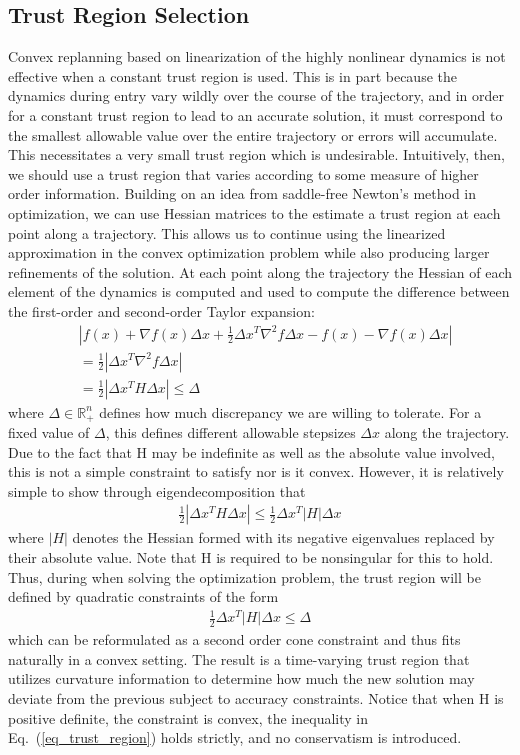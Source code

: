 \documentclass[10pt,a4paper]{article}
\begin{document}
	\subsection{Trust Region Selection}
	Convex replanning based on linearization of the highly nonlinear dynamics is not effective when a constant trust region is used. This is in part because the dynamics during entry vary wildly over the course of the trajectory, and in order for a constant trust region to lead to an accurate solution, it must correspond to the smallest allowable value over the entire trajectory or errors will accumulate. This necessitates a very small trust region which is undesirable. Intuitively, then, we should use a trust region that varies according to some measure of higher order information. Building on an idea from saddle-free Newton's method in optimization, we can use Hessian matrices to the estimate a trust region at each point along a trajectory. This allows us to continue using the linearized approximation in the convex optimization problem while also producing larger refinements of the solution. At each point along the trajectory the Hessian of each element of the dynamics is computed and used to compute the difference between the first-order and second-order Taylor expansion:
	\begin{align}
	&|f(x) + \nabla f(x)\Delta x + \frac{1}{2}\Delta x^T \nabla^2f\Delta x - f(x) - \nabla f(x)\Delta x |\\
	&= \frac{1}{2}|\Delta x^T \nabla^2f\Delta x| \\
	&= \frac{1}{2}|\Delta x^T H\Delta x| \le \Delta
	\end{align}
	where $\Delta\in\mathbb{R}^n_+$ defines how much discrepancy we are willing to tolerate. For a fixed value of $\Delta$, this defines different allowable stepsizes $\Delta x$ along the trajectory. Due to the fact that H may be indefinite as well as the absolute value involved, this is not a simple constraint to satisfy nor is it convex. However, it is relatively simple to show through eigendecomposition that 
	\begin{align}
	\frac{1}{2}|\Delta x^T H\Delta x| \le \frac{1}{2}\Delta x^T |H|\Delta x
	\end{align}
	where $ |H| $ denotes the Hessian formed with its negative eigenvalues replaced by their absolute value. Note that H is required to be nonsingular for this to hold. Thus, during when solving the optimization problem, the trust region will be defined by quadratic constraints of the form
	\begin{align}
	\frac{1}{2}\Delta x^T |H|\Delta x \le \Delta \label{eq_trust_region}
	\end{align}
	which can be reformulated as a second order cone constraint and thus fits naturally in a convex setting. The result is a time-varying trust region that utilizes curvature information to determine how much the new solution may deviate from the previous subject to accuracy constraints. Notice that when H is positive definite, the constraint is convex, the inequality in Eq.~(\ref{eq_trust_region}) holds strictly, and no conservatism is introduced. 
\end{document}
